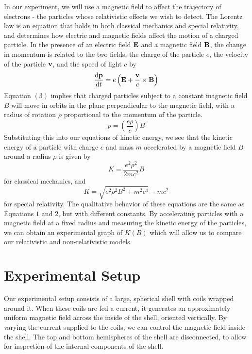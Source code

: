 In our experiment, we will use a magnetic field to affect the trajectory of electrons - the particles whose relativistic effects we wish to detect. The Lorentz law is an equation that holds in both classical mechanics and special relativity, and determines how electric and magnetic fields affect the motion of a charged particle. In the presence of an electric field $\vb{E}$ and a magnetic field $\vb{B}$, the change in momentum is related to the two fields, the charge of the particle $e$, the velocity of the particle $\vb{v}$, and the speed of light $c$ by
\begin{equation}
    \dv{\vb{p}}{t} = e\left(\vb{E} + \frac{\vb{v}}{c} \times \vb{B} \right)
  \end{equation}
  Equation $(3)$ implies that charged particles subject to a constant magnetic field $B$ will move in orbits in the plane perpendicular to the magnetic field, with a radius of rotation $\rho$ proportional to the momentum of the particle.
  \begin{equation}
    p = \left(\frac{e\rho}{c}\right) B
  \end{equation}
Substituting this into our equations of kinetic energy, we see that the kinetic energy of a particle with charge $e$ and mass $m$ accelerated by a magnetic field $B$ around a radius $\rho$ is given by
\begin{equation}
  K = \frac{e^2 \rho^2}{2mc^2} B
\end{equation}
for classical mechanics, and
\begin{equation}
  K = \sqrt{e^2 \rho^2 B^2 + m^2 c^4} - mc^2
\end{equation}
for special relativity. The qualitative behavior of these equations are the same as Equations $1$ and $2$, but with different constants. By accelerating particles with a magnetic field at a fixed radius and measuring the kinetic energy of the particles, we can obtain an experimental graph of $K(B)$ which will allow us to compare our relativistic and non-relativistic models.
\section{Experimental Setup}
Our experimental setup consists of a large, spherical shell with coils wrapped around it. When these coils are fed a current, it generates an approximately uniform magnetic field across the inside of the shell, oriented vertically. By varying the current supplied to the coils, we can control the magnetic field inside the shell. The top and bottom hemispheres of the shell are disconnected, to allow for inspection of the internal components of the shell.

